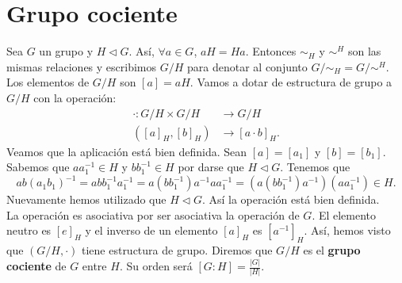 \section{Grupo cociente}
Sea $\displaystyle G $ un grupo y $\displaystyle H \lhd G $. Así, $\displaystyle \forall a \in G $, $\displaystyle aH = Ha $. Entonces $\displaystyle \sim_{H} $ y $\displaystyle \sim^{H} $ son las mismas relaciones y escribimos $\displaystyle G/H $ para denotar al conjunto $\displaystyle G/\sim_{H} = G/\sim^{H} $. Los elementos de $\displaystyle G/H $ son $\displaystyle \left[a\right] = aH $. Vamos a dotar de estructura de grupo a $\displaystyle G / H$ con la operación:
\[
\begin{split}
	\cdot : G/H \times G/H& \to G/H \\
	\left([a]_{H}, [b]_{H}\right) & \to [a \cdot b]_{H}.
\end{split}
\]
Veamos que la aplicación está bien definida. Sean $\displaystyle \left[a\right]  = \left[a_{1}\right]  $ y $\displaystyle \left[b\right]  = \left[b_{1}\right]  $. Sabemos que $\displaystyle a a^{-1}_{1} \in H $ y $\displaystyle b b^{-1}_{1} \in H $ por darse que $\displaystyle H \lhd G $. Tenemos que
\[ab\left(a_{1}b_{1}\right)^{-1} = abb^{-1}_{1}a^{-1}_{1} = a\left(bb^{-1}_{1}\right)a^{-1}a a^{-1}_{1} = \left(a\left(bb^{-1}_{1}\right)a^{-1}\right)\left(a a^{-1}_{1}\right) \in H .\]
Nuevamente hemos utilizado que $\displaystyle H \lhd G $. Así la operación está bien definida. \\ 
La operación es asociativa por ser asociativa la operación de $\displaystyle G $. 
El elemento neutro es $\displaystyle [e]_{H} $ y el inverso de un elemento $\displaystyle [a]_{H} $ es $\displaystyle [a^{-1}] _{H}$.
Así, hemos visto que $\displaystyle \left(G/H, \cdot \right) $ tiene estructura de grupo. Diremos que $\displaystyle G/H $ es el \textbf{grupo cociente} de $\displaystyle G $ entre $\displaystyle H $. Su orden será $\displaystyle \left[G:H\right]  = \frac{ \left|G\right|}{|H|} $.
